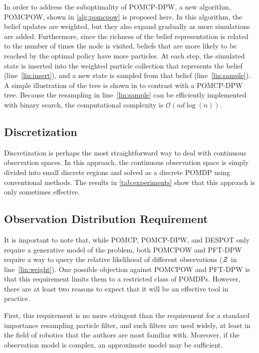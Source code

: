 In order to address the suboptimality of POMCP-DPW, a new algorithm, POMCPOW, shown in \cref{alg:pomcpow} is proposed here.
In this algorithm, the belief updates are weighted, but they also expand gradually as more simulations are added.
Furthermore, since the richness of the belief representation is related to the number of times the node is visited, beliefs that are more likely to be reached by the optimal policy have more particles.
At each step, the simulated state is inserted into the weighted particle collection that represents the belief (line~\ref{lin:insert}), and a new state is sampled from that belief (line~\ref{lin:sample}).
A simple illustration of the tree is shown in  to contrast with a POMCP-DPW tree.
Because the resampling in line~\ref{lin:sample} can be efficiently implemented with binary search, the computational complexity is $\mathcal{O}(n d \log(n))$.

\subsection{Discretization} \label{sec:discretization}

Discretization is perhaps the most straightforward way to deal with continuous observation spaces.
In this approach, the continuous observation space is simply divided into small discrete regions and solved as a discrete POMDP using conventional methods.
The results in \cref{tab:experiments} show that this approach is only sometimes effective.

\subsection{Observation Distribution Requirement}

It is important to note that, while POMCP, POMCP-DPW, and DESPOT only require a generative model of the problem,  both POMCPOW and PFT-DPW require a way to query the relative likelihood of different observations ($\mathcal{Z}$ in line~\ref{lin:weight}).
One possible objection against POMCPOW and PFT-DPW is that this requirement limits them to a restricted class of POMDPs.
However, there are at least two reasons to expect that it will be an effective tool in practice.

First, this requirement is no more stringent than the requirement for a standard importance resampling particle filter, and such filters are used widely, at least in the field of robotics that the authors are most familiar with. 
Moreover, if the observation model is complex, an approximate model may be sufficient.

